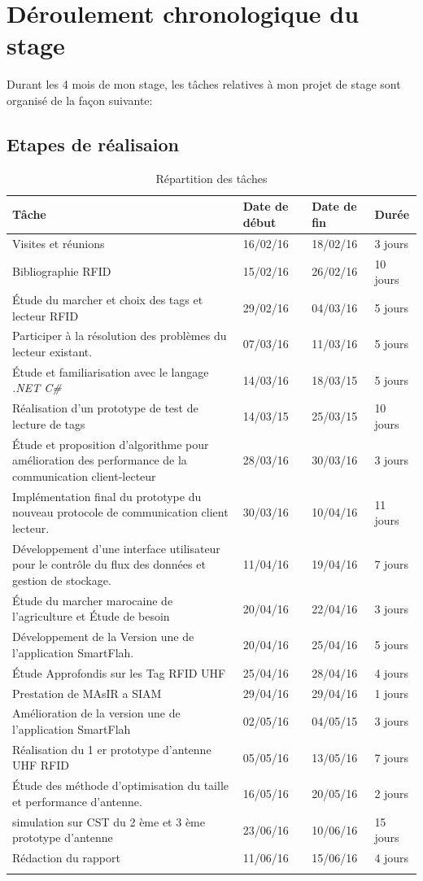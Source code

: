 \documentclass[11pt, a4paper, twoside]{book}
\begin{document}
\section{Déroulement chronologique du stage}
Durant les 4 mois de mon stage, les tâches relatives à mon projet de stage sont organisé de la façon suivante:
\subsection{Etapes	de	réalisaion}
\begin{longtable}{|p{}|p{}|p{}| p{}|}
\hline
\textbf{Tâche} & \textbf{Date de début} & \textbf{Date de fin} & \textbf{Durée} \\
\hline
Visites et réunions & 16/02/16 & 18/02/16 & 3 jours \\
\hline
Bibliographie RFID & 15/02/16 & 26/02/16 & 10 jours \\
\hline
Étude du marcher et choix des tags et lecteur RFID & 29/02/16 & 04/03/16 & 5 jours \\
\hline
Participer à  la résolution des problèmes du lecteur existant.
 & 07/03/16 & 11/03/16 & 5 jours \\
\hline
Étude et familiarisation avec le langage \emph{.NET C\#} & 14/03/16 & 18/03/15 & 5 jours \\
\hline
Réalisation d'un prototype de test de lecture de tags & 14/03/15 & 25/03/15 & 10 jours \\
\hline
 Étude et proposition d'algorithme pour amélioration des performance de la communication client-lecteur
 & 28/03/16 & 30/03/16 & 3 jours \\
\hline
Implémentation final du prototype du nouveau protocole de communication client lecteur.
 & 30/03/16 & 10/04/16 & 11 jours \\
\hline
Développement d'une interface utilisateur pour le contrôle du flux des données et gestion de stockage.
 & 11/04/16 & 19/04/16 & 7 jours \\
\hline
Étude du marcher marocaine de l'agriculture et Étude de besoin & 20/04/16 & 22/04/16 & 3 jours \\
\hline
Développement de la Version une de l'application SmartFlah. & 20/04/16 & 25/04/16 & 5 jours \\
\hline
Étude Approfondis sur les Tag RFID UHF  & 25/04/16 & 28/04/16 & 4 jours \\
\hline
Prestation de MAsIR a SIAM  & 29/04/16 & 29/04/16 & 1 jours \\
\hline
Amélioration de la version une de l'application SmartFlah & 02/05/16 & 04/05/15 & 3 jours \\
\hline
Réalisation du 1 er prototype d'antenne UHF RFID & 05/05/16 & 13/05/16 & 7 jours \\
\hline
Étude des méthode d'optimisation du taille et performance d'antenne. & 16/05/16 & 20/05/16 & 2 jours \\
\hline
simulation sur CST du 2 ème et 3 ème prototype d'antenne & 23/06/16 & 10/06/16 & 15 jours \\
\hline
Rédaction du rapport & 11/06/16 & 15/06/16 & 4 jours \\
\hline
\caption{Répartition des tâches}
\end{longtable}
\end{document}
